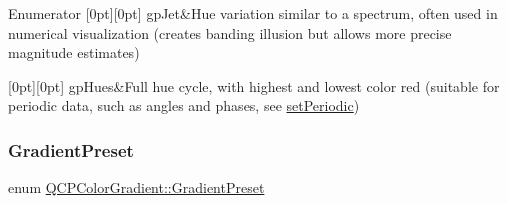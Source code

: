 \begin{DoxyEnumFields}{Enumerator}
[0pt][0pt]{}\mbox{\label{class_q_c_p_color_gradient_aed6569828fee337023670272910c9072a099491b74c9e2121da78a5c5900173c1}} 
gp\+Jet&Hue variation similar to a spectrum, often used in numerical visualization (creates banding illusion but allows more precise magnitude estimates) \\
\hline

[0pt][0pt]{}\mbox{\label{class_q_c_p_color_gradient_aed6569828fee337023670272910c9072aa9382f15c19d131045d8ee3b4a40b799}} 
gp\+Hues&Full hue cycle, with highest and lowest color red (suitable for periodic data, such as angles and phases, see \hyperlink{class_q_c_p_color_gradient_a39d6448155fc00a219f239220d14bb39}{set\+Periodic}) \\
\hline

\end{DoxyEnumFields}
\mbox{\label{class_q_c_p_color_gradient_aed6569828fee337023670272910c9072}} 
\subsubsection{\texorpdfstring{Gradient\+Preset}{GradientPreset}\hspace{0.1cm}{\footnotesize\ttfamily [2/2]}}
{\footnotesize\ttfamily enum \hyperlink{class_q_c_p_color_gradient_aed6569828fee337023670272910c9072}{Q\+C\+P\+Color\+Gradient\+::\+Gradient\+Preset}}

